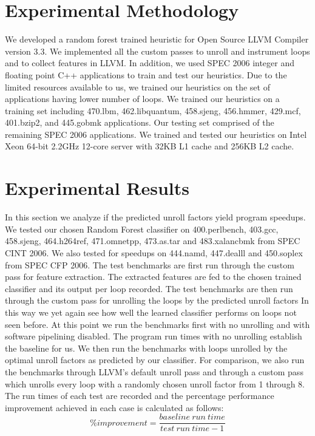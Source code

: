 \documentclass[]{sig-alternate}
\begin{document}


\section{Experimental Methodology}\label{sec:experimental_methodology}
We developed a random forest trained heuristic for Open Source LLVM Compiler version 3.3. We implemented all the custom passes to unroll and instrument loops and to collect features in LLVM. In addition, we used SPEC 2006 integer and floating point C++ applications to train and test our heuristics. Due to the limited resources available to us, we trained our heuristics on the set of applications having lower number of loops. We trained our heuristics on a training set including 470.lbm, 462.libquantum, 458.sjeng, 456.hmmer, 429.mcf, 401.bzip2, and 445.gobmk applications. Our testing set comprised of the remaining SPEC 2006 applications. We trained and tested our heuristics on Intel Xeon 64-bit 2.2GHz 12-core server with 32KB L1 cache and 256KB L2 cache.


\section{Experimental Results}\label{sec:experimental_results}
In this section we analyze if the predicted unroll factors yield program speedups. We tested our chosen Random Forest classifier on  400.perlbench, 403.gcc, 458.sjeng, 464.h264ref, 471.omnetpp, 473.as.tar and 483.xalancbmk from SPEC CINT 2006. We also tested for speedups on 444.namd, 447.dealll and 450.soplex from SPEC CFP 2006. The test benchmarks are first run through the custom pass for feature extraction. The extracted features are fed to the chosen trained classifier and its output per loop recorded. The test benchmarks are then run through the custom pass for unrolling the loops by the predicted unroll factors In this way we yet again see how well the learned classifier performs on loops not seen before. At this point we run the benchmarks first with no unrolling and with software pipelining disabled. The program run times with no unrolling establish the baseline for us. We then run the benchmarks with loops unrolled by the optimal unroll factors as predicted by our classifier. For comparison, we also run the benchmarks through LLVM's default unroll pass and through a custom pass which unrolls every loop with a randomly chosen unroll factor from 1 through 8. The run times of each test are recorded and the percentage performance improvement achieved in each case is calculated as follows:
\begin{equation}
 \% improvement = \frac{baseline\ run\  time}{test\ run\ time - 1}
\end{equation}
\end{document}
